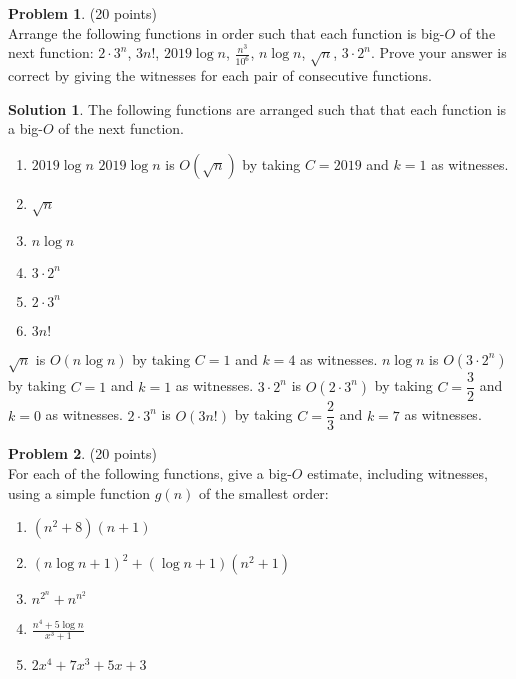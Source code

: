 \documentclass{article}
\theoremstyle{definition}
\newtheorem{problem}{Problem}
\newtheorem*{solution}{Solution}
\begin{document}
\newpage

\begin{problem} (20 points)\\
Arrange the following functions in order such that each function is big-$O$ of the next function:  $2\cdot3^n$, $3n!$, $2019\log{n}$, $\displaystyle \frac{n^3}{10^6}$, $n\log{n}$,  $\sqrt{n}$, $3\cdot2^n$.  Prove your answer is correct by giving the witnesses for each pair of consecutive functions.
\end{problem}

\begin{solution}
\item The following functions are arranged such that that each function is a big-$O$ of the next function.
\begin{enumerate}
\item $2019\log{n}$ \newline
$2019\log{n}$ is $O(\sqrt{n})$ by taking $C = 2019$ and $k = 1$ as witnesses. 
\item $\sqrt{n}$
\item $n\log{n}$
\item $3\cdot2^n$
\item $2\cdot3^n$
\item $3n!$
\bigskip
\end{enumerate}

$\sqrt{n}$ is $O(n\log{n})$ by taking  $C = 1$ and $k = 4$ as witnesses. \bigskip\newline
$n\log{n}$ is $O(3\cdot2^n)$ by taking  $C = 1$ and $k = 1$ as witnesses. \bigskip\newline
$3\cdot2^n$ is $O(2\cdot3^n)$ by taking  $C = \dfrac{3}{2}$ and $k = 0$ as witnesses. \bigskip\newline
$2\cdot3^n$ is $O(3n!)$ by taking  $C = \dfrac{2}{3}$ and $k = 7$ as witnesses. \bigskip\newline
\end{solution}

\newpage

\begin{problem} (20 points)\\
For each of the following functions, give a big-$O$ estimate, including witnesses, using a simple function $g(n)$ of the smallest order:
\begin{enumerate}
\item $(n^2+8)(n+1)$
\item $(n\log{n} + 1)^2+(\log{n}+1)(n^2+1)$
\item $\displaystyle n^{2^n}+n^{n^2}$
\item $\displaystyle \frac{n^4+5\log{n}}{x^3+1}$
\item $2x^4+7x^3+5x+3$
\end{enumerate}
\end{problem}
\end{document}
